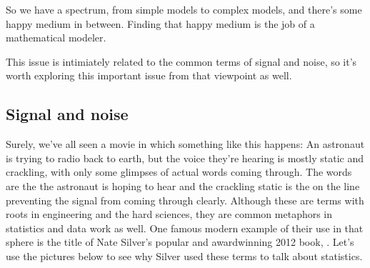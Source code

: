 \documentclass[letterpaper,10pt,english]{jupyterBook}
\begin{document}
\sphinxAtStartPar
So we have a spectrum, from simple models to complex models, and there’s some happy medium in between.  Finding that happy medium is the job of a mathematical modeler.

\sphinxAtStartPar
This issue is intimiately related to the common terms of signal and noise, so it’s worth exploring this important issue from that viewpoint as well.


\subsection{Signal and noise}
\label{\detokenize{chapter-17-machine-learning:signal-and-noise}}
\sphinxAtStartPar
Surely, we’ve all seen a movie in which something like this happens:  An astronaut is trying to radio back to earth, but the voice they’re hearing is mostly static and crackling, with only some glimpses of actual words coming through.  The words are the  the astronaut is hoping to hear and the crackling static is the  on the line preventing the signal from coming through clearly.  Although these are terms with roots in engineering and the hard sciences, they are common metaphors in statistics and data work as well.  One famous modern example of their use in that sphere is the title of Nate Silver’s popular and award\sphinxhyphen{}winning 2012 book, .  Let’s use the pictures below to see why Silver used these terms to talk about statistics.

\sphinxAtStartPar
{}
\end{document}
